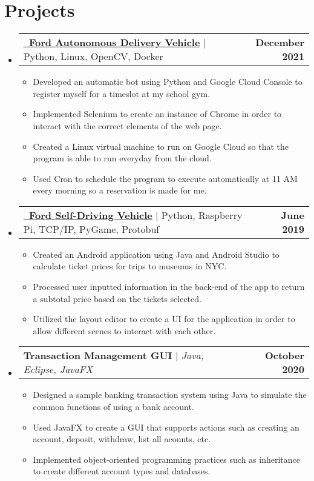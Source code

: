 \documentclass[letterpaper,11pt]{article}
\makeatletter
\newcommand{\resumeItem}[1]{
  \item\small{
    {#1 \vspace{-2pt}}
  }
}
\newcommand{\resumeProjectHeading}[2]{
    \item
    \begin{tabular*}{1.001\textwidth}{l@{\extracolsep{\fill}}r}
      \small#1 & \textbf{\small #2}\\
    \end{tabular*}\vspace{-7pt}
}
\newcommand{\resumeSubHeadingListStart}{\begin{itemize}[leftmargin=0.0in, label={}]}
\newcommand{\resumeSubHeadingListEnd}{\end{itemize}}
\newcommand{\resumeItemListStart}{\begin{itemize}}
\newcommand{\resumeItemListEnd}{\end{itemize}\vspace{-5pt}}
\makeatother
\begin{document}
\section{Projects}
    \vspace{-5pt}
    \resumeSubHeadingListStart
      \resumeProjectHeading
          {\textbf{\href{https://www.detroitnews.com/story/business/autos/ford/2021/12/14/ford-autonomous-shuttle-deliver-food-detroit-senior-citizens/6498168001/}{\faLink\ \uline {Ford Autonomous Delivery Vehicle}}} $|$ Python, Linux, OpenCV, Docker}{December 2021}
          \resumeItemListStart
            \resumeItem{Developed an automatic bot using Python and Google Cloud Console to register myself for a timeslot at my school gym.}
            \resumeItem{Implemented Selenium to create an instance of Chrome in order to interact with the correct elements of the web page.}
            \resumeItem{Created a Linux virtual machine to run on Google Cloud so that the program is able to run everyday from the cloud.}
            \resumeItem{Used Cron to schedule the program to execute automatically at 11 AM every morning so a reservation is made for me.}
          \resumeItemListEnd
          \vspace{-13pt}
      \resumeProjectHeading
          {\textbf{\href{https://www.cnet.com/roadshow/news/argo-ai-third-generation-self-driving-development-car-detroit/}{\faLink\ \uline{Ford Self-Driving Vehicle}}} $|$ Python, Raspberry Pi, TCP/IP, PyGame, Protobuf}{June 2019}
          \resumeItemListStart
            \resumeItem{Created an Android application using Java and Android Studio to calculate ticket prices for trips to museums in NYC.}
            \resumeItem{Processed user inputted information in the back-end of the app to return a subtotal price based on the tickets selected.}
            \resumeItem{Utilized the layout editor to create a UI for the application in order to allow different scenes to interact with each other.}
          \resumeItemListEnd 
          \vspace{-13pt}
          \resumeProjectHeading
          {\textbf{Transaction Management GUI} $|$ \emph{Java, Eclipse, JavaFX}}{October 2020}
          \resumeItemListStart
            \resumeItem{Designed a sample banking transaction system using Java to simulate the common functions of using a bank account.}
            \resumeItem{Used JavaFX to create a GUI that supports actions such as creating an account, deposit, withdraw, list all acounts, etc.}
            \resumeItem{Implemented object-oriented programming practices such as inheritance to create different account types and databases.}
          \resumeItemListEnd 
    \resumeSubHeadingListEnd
\vspace{-15pt}
\end{document}
